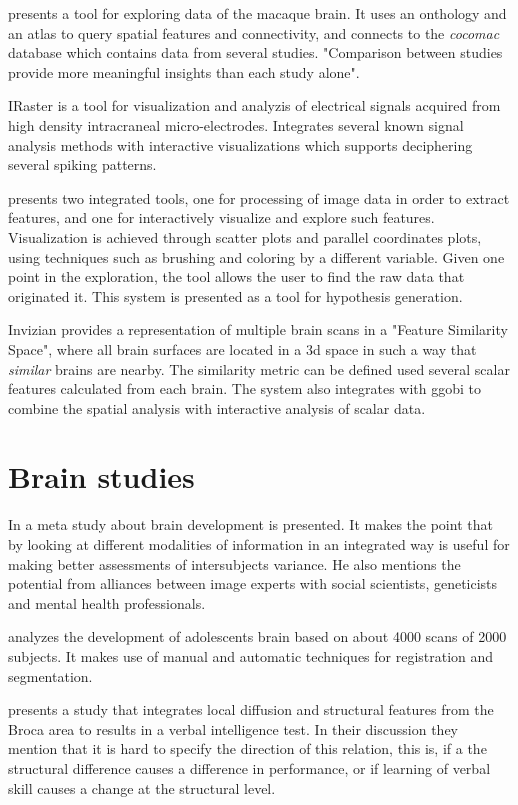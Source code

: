 \autocite{bezgin_matching_2009} presents a tool for exploring data of the macaque brain. It uses an onthology and an atlas to query spatial features and connectivity, and connects to the \emph{cocomac} database which contains data from several studies. "Comparison between studies provide more meaningful insights than each study alone".

IRaster \autocite{somerville_iraster:_2010}  is a tool for visualization and analyzis of electrical signals acquired from high density intracraneal micro-electrodes. Integrates several known signal analysis methods with interactive visualizations which supports deciphering several spiking patterns.

\autocite{steenwijk_integrated_2010} presents two integrated tools, one for processing of image data in order to extract features, and one for interactively visualize and explore such features. Visualization is achieved through scatter plots and parallel coordinates plots, using techniques such as brushing and coloring by a different variable.  Given one point in the exploration, the tool allows the user to find the raw data that originated it. This system is presented as a tool for hypothesis generation. 

Invizian \autocite{bowman_query-based_2011, bowman_visual_2012, van_horn_graphical_2013} provides a representation of multiple brain scans in a "Feature Similarity Space", where all brain surfaces are located in a 3d space in such a way that \emph{similar} brains are nearby. The similarity metric can be defined used several scalar features calculated from each brain. The system also integrates with ggobi to combine the spatial analysis with interactive analysis of scalar data.

\section{Brain studies}

In \autocite{paus_mapping_2005} a meta study about brain development is presented. It makes the point that by looking at different modalities of information in an integrated way is useful for making better assessments of intersubjects variance. He also mentions the potential from alliances between image experts with social scientists, geneticists and mental health professionals.

\autocite{lenroot_brain_2006} analyzes the development of adolescents brain based on about 4000 scans of 2000 subjects. It makes use of manual and automatic techniques for registration and segmentation.

\autocite{konrad_vbmdti_2012} presents a study that integrates local diffusion and structural features from the Broca area to results in a verbal intelligence test. In their discussion they mention that it is hard to specify the direction of this relation, this is, if a the structural difference causes a difference in performance, or if learning of verbal skill causes a change at the structural level. 

